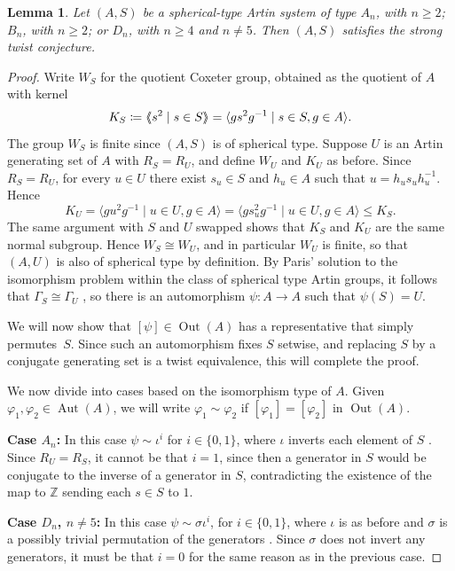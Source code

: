 \documentclass[svgnames]{amsart}
\theoremstyle{plain}
\newtheorem{lemma}[thm]{Lemma}
\theoremstyle{definition}
\newcommand{\aut}[1]{\operatorname{Aut}(#1)}
\newcommand{\out}[1]{\operatorname{Out}(#1)}
\DeclarePairedDelimiter{\nspan}{\langle\mkern-5mu\langle}{\rangle\mkern-5mu\rangle}
\renewcommand{\phi}{\varphi}
\begin{document}
\begin{lemma}\label{lem:strong_spherical}
    Let $(A,S)$ be a spherical-type Artin system of type $A_n$, with $n \geq 2$; $B_n$, with $n \geq 2$; or $D_n$, with $n \geq 4$ and $n \neq 5$. Then $(A,S)$ satisfies the strong twist conjecture.
\end{lemma}
\begin{proof}
    Write $W_S$ for the quotient Coxeter group, obtained as the quotient of $A$ with kernel $$K_S \coloneq  \nspan{s^2 \mid s \in S}=\langle gs^2g^{-1} \mid s\in S, g\in A\rangle.$$ The group $W_S$ is finite since $(A,S)$ is of spherical type. Suppose $U$ is an Artin generating set of $A$ with $R_S = R_U$, and define $W_U$ and $K_U$ as before. Since $R_S=R_U$, for every $u\in U$ there exist $s_u\in S$ and $h_u\in A$ such that $u=h_us_uh_u^{-1}$. Hence 
    $$K_U =\langle gu^2g^{-1} \mid u\in U, g\in A\rangle=\langle gs_u^2g^{-1} \mid u\in U, g\in A\rangle\le K_S.$$
    The same argument with $S$ and $U$ swapped shows that $K_S$ and $K_U$ are the same normal subgroup. Hence $W_S \cong W_U$, and in particular $W_U$ is finite, so that $(A,U)$ is also of spherical type by definition. By Paris' solution to the isomorphism problem within the class of spherical type Artin groups, it follows that $\Gamma_S \cong \Gamma_U$ \cite{Paris_isoprob_spherical}, so there is an automorphism $\psi: A \rightarrow A$ such that $\psi(S)  = U$.
    
     We will now show that $[\psi] \in \out{A}$ has a representative that simply permutes~$S$. Since such an automorphism fixes $S$ setwise, and replacing $S$ by a conjugate generating set is a twist equivalence, this will complete the proof.

     
     We now divide into cases based on the isomorphism type of $A$. Given $\phi_1, \phi_2 \in \aut{A}$, we will write $\phi_1 \sim \phi_2$ if $[\phi_1] = [\phi_2]$ in $\out{A}$. 

    \textbf{Case $A_n$:} In this case $\psi \sim \iota^i$ for $i \in \{0, 1\}$, where $\iota$ inverts each element of $S$ \cite{dyer1981automorphism}. Since $R_U = R_S$, it cannot be that $i = 1$, since then a generator in $S$ would be conjugate to the inverse of a generator in $S$, contradicting the existence of the map to $\mathbb{Z}$ sending each $s \in S$ to $1$.

    \textbf{Case $D_n$, $n \neq 5$:} In this case $\psi \sim \sigma\iota^i$, for $i \in \{0,1\}$, where $\iota$ is as before and $\sigma$ is a possibly trivial permutation of the generators \cite{soroko2021d4, castel2024endomorphisD}. Since $\sigma$ does not invert any generators, it must be that $i = 0$ for the same reason as in the previous case.


\end{proof}
\end{document}

